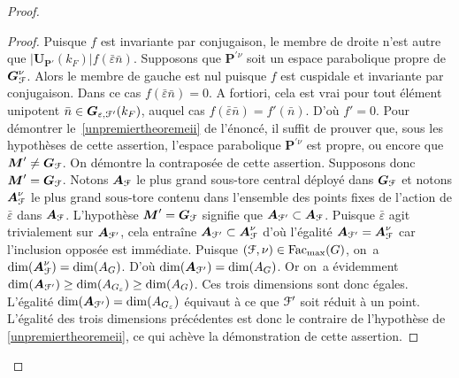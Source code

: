 \documentclass[11pt]{article}
\numberwithin{equation}{section}\providecommand{\og}{«\,}\providecommand{\fg}{\,»}
\let\mathcal \EuScript
\let\epsilon\varepsilon
\newcommand{\Fac}{\mathrm{Fac}}
\newcommand{\bA}{\boldsymbol{A}}
\newcommand{\bG}{\boldsymbol{G}}
\newcommand{\bM}{\boldsymbol{M}}
\newcommand{\bP}{\boldsymbol{P}}
\newcommand{\bU}{\boldsymbol{U}}
\newcommand{\cF}{\mathcal{F}}
\theoremstyle{plain}
\theoremstyle{definition}
\begin{document}
\begin{proof}
\begin{proof}
Puisque $f$ est invariante par conjugaison, le membre de droite n'est autre que $\vert \bU_{\bP'}(k_{F})\vert f(\bar{\epsilon}\bar{n})$. Supposons que $\bP^{\prime\nu}$ soit un espace parabolique propre de $\bG_{\cF}^{\nu}$. Alors le membre de gauche est nul puisque $f$ est cuspidale et invariante par conjugaison. Dans ce cas $f(\bar{\epsilon}\bar{n})=0$. A fortiori, cela est vrai pour tout élément unipotent $\bar{n}\in \bG_{\epsilon,\cF'}(k_{F})$, auquel cas $f(\bar{\epsilon}\bar{n})=f'(\bar{n})$. D'où $f'=0$. Pour démontrer le~\eqref{unpremiertheoremeii} de l'énoncé, il suffit de prouver que, sous les hypothèses de cette assertion, l'espace parabolique $\bP^{\prime\nu}$ est propre, ou encore que $\bM'\neq\bG_{\cF}$. On démontre la contraposée de cette assertion. Supposons donc $\bM'=\bG_{\cF}$. Notons $\bA_{\cF}$ le plus grand sous-tore central déployé dans $\bG_{\cF}$ et notons $\bA_{\cF}^{\nu}$ le plus grand sous-tore contenu dans l'ensemble des points fixes de l'action de $\bar{\epsilon}$ dans $\bA_{\cF}$. L'hypothèse $\bM'=\bG_{\cF}$ signifie que $\bA_{\cF'}\subset \bA_{\cF}$. Puisque $\bar{\epsilon}$ agit trivialement sur $\bA_{\cF'}$, cela entraîne $\bA_{\cF'}\subset \bA_{\cF}^{\nu}$ d'où l'égalité $\bA_{\cF'}= \bA_{\cF}^{\nu}$ car l'inclusion opposée est immédiate. Puisque $(\cF,\nu)\in \Fac_{\max}(G)$, on~a $\dim( \bA_{\cF}^{\nu})=\dim(A_{G})$. D'où $\dim(\bA_{\cF'})=\dim(A_{G})$. Or on~a évidemment $\dim(\bA_{\cF'})\geq \dim(A_{G_{\epsilon}})\geq \dim(A_{G})$. Ces trois dimensions sont donc égales. L'égalité $\dim(\bA_{\cF'})= \dim(A_{G_{\epsilon}})$ équivaut à ce que $\cF'$ soit réduit à un point. L'égalité des trois dimensions précédentes est donc le contraire de l'hypothèse de \eqref{unpremiertheoremeii}, ce qui achève la démonstration de cette assertion.


\end{proof}
\end{proof}
\end{document}
